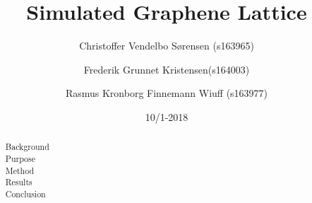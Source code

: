



\begin{abstract}
  \begin{description}
    \item[Background]
    \item[Purpose]
    \item[Method]
    \item[Results]
    \item[Conclusion]
  \end{description}
\end{abstract}

\title{Simulated Graphene Lattice}
\date{10/1-2018}
\author{Christoffer Vendelbo Sørensen (s163965)}
\author{Frederik Grunnet Kristensen(s164003)}
\author{Rasmus Kronborg Finnemann Wiuff (s163977)}

\maketitle


\tableofcontents
\thispagestyle{empty}
\newpage
\setcounter{page}{1}



\newpage




\newpage

\listoffigures
\listoftables
\newpage





